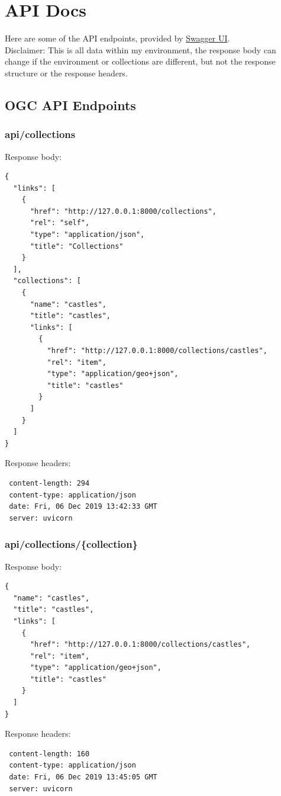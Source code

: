 \chapter{API Docs}
Here are some of the API endpoints, provided by \href{https://swagger.io/}{Swagger UI}.\\
Disclaimer: This is all data within my environment, the response body can change if the environment or collections are different, but not the response structure or the response headers.
\section{OGC API Endpoints}
\subsection{api/collections}
Response body:
\begin{verbatim}
{
  "links": [
    {
      "href": "http://127.0.0.1:8000/collections",
      "rel": "self",
      "type": "application/json",
      "title": "Collections"
    }
  ],
  "collections": [
    {
      "name": "castles",
      "title": "castles",
      "links": [
        {
          "href": "http://127.0.0.1:8000/collections/castles",
          "rel": "item",
          "type": "application/geo+json",
          "title": "castles"
        }
      ]
    }
  ]
}
\end{verbatim}
Response headers:
\begin{verbatim}
 content-length: 294 
 content-type: application/json 
 date: Fri, 06 Dec 2019 13:42:33 GMT 
 server: uvicorn 
\end{verbatim}
\subsection{api/collections/\{collection\}}
Response body:
\begin{verbatim}
{
  "name": "castles",
  "title": "castles",
  "links": [
    {
      "href": "http://127.0.0.1:8000/collections/castles",
      "rel": "item",
      "type": "application/geo+json",
      "title": "castles"
    }
  ]
}
\end{verbatim}
Response headers:
\begin{verbatim}
 content-length: 160 
 content-type: application/json 
 date: Fri, 06 Dec 2019 13:45:05 GMT 
 server: uvicorn 
\end{verbatim}
\newpage
